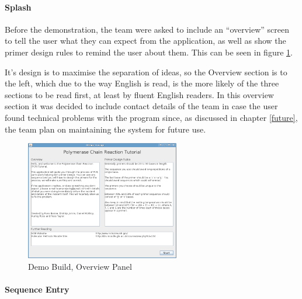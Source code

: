 \paragraph{Splash}

Before the demonstration, the team were asked to include an
``overview'' screen to tell the user what they can expect from the
application, as well as show the primer design rules to remind the
user about them.
This can be seen in figure \ref{fig:demoBuild:splash}.

It's design is to maximise the separation of ideas, so the Overview
section is to the left, which due to the way English is read, is the
more likely of the three sections to be read first, at least by fluent
English readers.
In this overview section it was decided to include contact details
of the team in case the user found technical problems with the
program since, as discussed in chapter \ref{future}, the
team plan on maintaining the system for future use.

\begin{figure}[h]
  \begin{center}
    \includegraphics[width=0.6\textwidth]{./images/demoBuild/splash.png}
    \caption{
      \label{fig:demoBuild:splash}
      Demo Build, Overview Panel 
    }
  \end{center}
\end{figure}

\paragraph{Sequence Entry}

